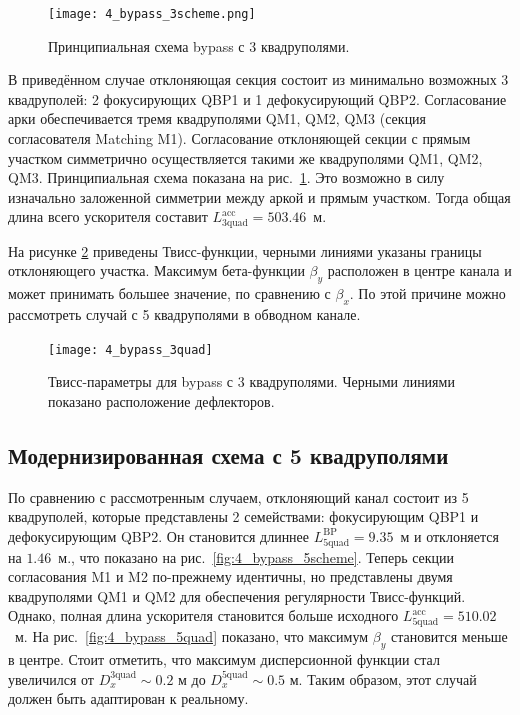 \begin{figure}[!h]
	\centering
	\texttt{[image: 4\_bypass\_3scheme.png]}
	\caption{Принципиальная схема bypass с 3 квадруполями.}
	\label{fig:4_bypass_3scheme}
\end{figure}

\par В приведённом случае отклоняющая секция состоит из минимально возможных 3 квадруполей: 2 фокусирующих QBP1 и 1 дефокусирующий QBP2. Согласование арки обеспечивается тремя квадруполями QM1, QM2, QM3 (секция согласователя Matching M1). Согласование отклоняющей секции с прямым участком симметрично осуществляется такими же квадруполями QM1, QM2, QM3. Принципиальная схема показана на рис.~\ref{fig:4_bypass_3scheme}. Это возможно в силу изначально заложенной симметрии между аркой и прямым участком. Тогда общая длина всего ускорителя составит $L_{\textrm{3quad}}^{\textrm{acc}}=503.46$~м.
\par На рисунке \ref{fig:4_bypass_3quad} приведены Твисс-функции, черными линиями указаны границы отклоняющего участка. Максимум бета-функции $\beta_y$ расположен в центре канала и может принимать большее значение, по сравнению с $\beta_{x}$. По этой причине можно рассмотреть случай с 5 квадруполями в обводном канале.

\begin{figure}[!h]
  \centering
   \texttt{[image: 4\_bypass\_3quad]}
   \caption{Твисс-параметры для bypass с 3 квадруполями. Черными линиями показано расположение дефлекторов.}
   \label{fig:4_bypass_3quad}
\end{figure}

	\subsection{Модернизированная схема с 5 квадруполями}\label{sec:EDM/Wien_filter/ByPass/5quad}

\par По сравнению с рассмотренным случаем, отклоняющий канал состоит из 5 квадруполей, которые представлены 2 семействами: фокусирующим QBP1 и дефокусирующим QBP2. Он становится длиннее $L_{\textrm{5quad}}^{\textrm{BP}}=9.35$~м и отклоняется на $1.46$~м., что показано на рис.~\ref{fig:4_bypass_5scheme}. Теперь секции согласования M1 и M2 по-прежнему идентичны, но представлены двумя квадруполями QM1 и QM2 для обеспечения регулярности Твисс-функций. Однако, полная длина ускорителя становится больше исходного $L_{\textrm{5quad}}^{\textrm{acc}}=510.02$~м. На рис.~\ref{fig:4_bypass_5quad} показано, что максимум $\beta_y$ становится меньше в центре. Стоит отметить, что максимум дисперсионной функции стал увеличился от $D_x^{\textrm{3quad}} \sim 0.2$ м до $D_x^{\textrm{5quad}} \sim 0.5$ м. Таким образом, этот случай должен быть адаптирован к реальному.

